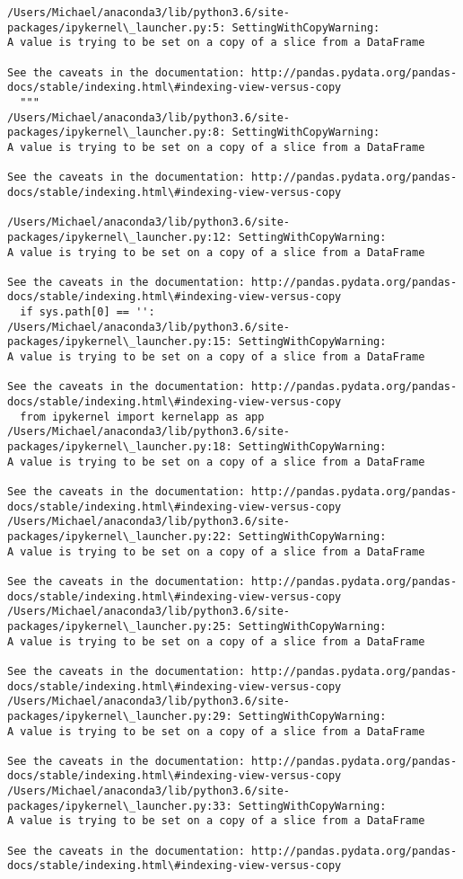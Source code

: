 \documentclass[11pt]{article}
\begin{document}
    \begin{Verbatim}[commandchars=\\\{\}]
/Users/Michael/anaconda3/lib/python3.6/site-packages/ipykernel\_launcher.py:5: SettingWithCopyWarning: 
A value is trying to be set on a copy of a slice from a DataFrame

See the caveats in the documentation: http://pandas.pydata.org/pandas-docs/stable/indexing.html\#indexing-view-versus-copy
  """
/Users/Michael/anaconda3/lib/python3.6/site-packages/ipykernel\_launcher.py:8: SettingWithCopyWarning: 
A value is trying to be set on a copy of a slice from a DataFrame

See the caveats in the documentation: http://pandas.pydata.org/pandas-docs/stable/indexing.html\#indexing-view-versus-copy
  
/Users/Michael/anaconda3/lib/python3.6/site-packages/ipykernel\_launcher.py:12: SettingWithCopyWarning: 
A value is trying to be set on a copy of a slice from a DataFrame

See the caveats in the documentation: http://pandas.pydata.org/pandas-docs/stable/indexing.html\#indexing-view-versus-copy
  if sys.path[0] == '':
/Users/Michael/anaconda3/lib/python3.6/site-packages/ipykernel\_launcher.py:15: SettingWithCopyWarning: 
A value is trying to be set on a copy of a slice from a DataFrame

See the caveats in the documentation: http://pandas.pydata.org/pandas-docs/stable/indexing.html\#indexing-view-versus-copy
  from ipykernel import kernelapp as app
/Users/Michael/anaconda3/lib/python3.6/site-packages/ipykernel\_launcher.py:18: SettingWithCopyWarning: 
A value is trying to be set on a copy of a slice from a DataFrame

See the caveats in the documentation: http://pandas.pydata.org/pandas-docs/stable/indexing.html\#indexing-view-versus-copy
/Users/Michael/anaconda3/lib/python3.6/site-packages/ipykernel\_launcher.py:22: SettingWithCopyWarning: 
A value is trying to be set on a copy of a slice from a DataFrame

See the caveats in the documentation: http://pandas.pydata.org/pandas-docs/stable/indexing.html\#indexing-view-versus-copy
/Users/Michael/anaconda3/lib/python3.6/site-packages/ipykernel\_launcher.py:25: SettingWithCopyWarning: 
A value is trying to be set on a copy of a slice from a DataFrame

See the caveats in the documentation: http://pandas.pydata.org/pandas-docs/stable/indexing.html\#indexing-view-versus-copy
/Users/Michael/anaconda3/lib/python3.6/site-packages/ipykernel\_launcher.py:29: SettingWithCopyWarning: 
A value is trying to be set on a copy of a slice from a DataFrame

See the caveats in the documentation: http://pandas.pydata.org/pandas-docs/stable/indexing.html\#indexing-view-versus-copy
/Users/Michael/anaconda3/lib/python3.6/site-packages/ipykernel\_launcher.py:33: SettingWithCopyWarning: 
A value is trying to be set on a copy of a slice from a DataFrame

See the caveats in the documentation: http://pandas.pydata.org/pandas-docs/stable/indexing.html\#indexing-view-versus-copy

    \end{Verbatim}
\end{document}
